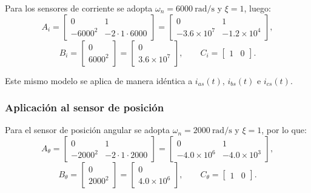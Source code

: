 \documentclass[12pt, a4paper,journal, onecolumn, compsoc]{IEEEtran}
\begin{document}
Para los sensores de corriente se adopta $\omega_n=6000\ \text{rad/s}$ y $\xi=1$, luego:
\begin{equation}
    A_i=
    \begin{bmatrix}
        0 & 1 \\
        -6000^2 & -2\cdot 1 \cdot 6000
    \end{bmatrix}
    =
    \begin{bmatrix}
        0 & 1 \\
        -3.6\times 10^7 & -1.2\times 10^4
    \end{bmatrix},
\end{equation}
\begin{equation}
    B_i=
    \begin{bmatrix}
        0 \\
        6000^2
    \end{bmatrix}
    =
    \begin{bmatrix}
        0 \\
        3.6\times 10^7
    \end{bmatrix},
    \qquad
    C_i=
    \begin{bmatrix}
        1 & 0
    \end{bmatrix}.
\end{equation}

Este mismo modelo se aplica de manera idéntica a $i_{as}(t)$, $i_{bs}(t)$ e $i_{cs}(t)$.

\subsubsection*{Aplicación al sensor de posición}

Para el sensor de posición angular se adopta $\omega_n=2000\ \text{rad/s}$ y $\xi=1$, por lo que:
\begin{equation}
    A_\theta=
    \begin{bmatrix}
        0 & 1 \\
        -2000^2 & -2\cdot 1 \cdot 2000
    \end{bmatrix}
    =
    \begin{bmatrix}
        0 & 1 \\
        -4.0\times 10^6 & -4.0\times 10^3
    \end{bmatrix},
\end{equation}
\begin{equation}
    B_\theta=
    \begin{bmatrix}
        0 \\
        2000^2
    \end{bmatrix}
    =
    \begin{bmatrix}
        0 \\
        4.0\times 10^6
    \end{bmatrix},
    \qquad
    C_\theta=
    \begin{bmatrix}
        1 & 0
    \end{bmatrix}.
\end{equation}
\end{document}
